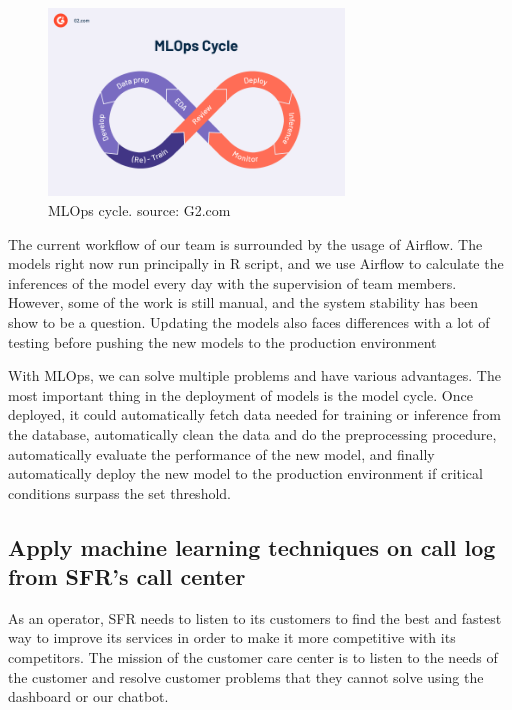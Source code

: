 \begin{figure}[H]
    \centering
    \includegraphics[width=0.7\textwidth]{images/G2CM_FI427_Learn_Article_[Machine_learning_operationalization]_Infographic_image1b_V1.png}
    \caption{MLOps cycle. source: G2.com}
    \label{fig:altice_campus}
\end{figure}

The current workflow of our team is surrounded by the usage of Airflow. The models right now run principally in R script, and we use Airflow to calculate the inferences of the model every day with the supervision of team members. However, some of the work is still manual, and the system stability has been show to be a question. Updating the models also faces differences with a lot of testing before pushing the new models to the production environment

With MLOps, we can solve multiple problems and have various advantages. The most important thing in the deployment of models is the model cycle. Once deployed, it could automatically fetch data needed for training or inference from the database, automatically clean the data and do the preprocessing procedure, automatically evaluate the performance of the new model, and finally automatically deploy the new model to the production environment if critical conditions surpass the set threshold.



\subsection{Apply machine learning techniques on call log from SFR's call center}

As an operator, SFR needs to listen to its customers to find the best and fastest way to improve its services in order to make it more competitive with its competitors. The mission of the customer care center is to listen to the needs of the customer and resolve customer problems that they cannot solve using the dashboard or our chatbot.

